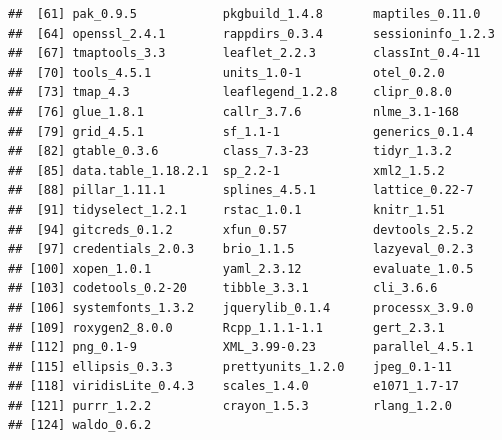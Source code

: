 \documentclass[
]{article}
\begin{document}
\begin{verbatim}
##  [61] pak_0.9.5            pkgbuild_1.4.8       maptiles_0.11.0     
##  [64] openssl_2.4.1        rappdirs_0.3.4       sessioninfo_1.2.3   
##  [67] tmaptools_3.3        leaflet_2.2.3        classInt_0.4-11     
##  [70] tools_4.5.1          units_1.0-1          otel_0.2.0          
##  [73] tmap_4.3             leaflegend_1.2.8     clipr_0.8.0         
##  [76] glue_1.8.1           callr_3.7.6          nlme_3.1-168        
##  [79] grid_4.5.1           sf_1.1-1             generics_0.1.4      
##  [82] gtable_0.3.6         class_7.3-23         tidyr_1.3.2         
##  [85] data.table_1.18.2.1  sp_2.2-1             xml2_1.5.2          
##  [88] pillar_1.11.1        splines_4.5.1        lattice_0.22-7      
##  [91] tidyselect_1.2.1     rstac_1.0.1          knitr_1.51          
##  [94] gitcreds_0.1.2       xfun_0.57            devtools_2.5.2      
##  [97] credentials_2.0.3    brio_1.1.5           lazyeval_0.2.3      
## [100] xopen_1.0.1          yaml_2.3.12          evaluate_1.0.5      
## [103] codetools_0.2-20     tibble_3.3.1         cli_3.6.6           
## [106] systemfonts_1.3.2    jquerylib_0.1.4      processx_3.9.0      
## [109] roxygen2_8.0.0       Rcpp_1.1.1-1.1       gert_2.3.1          
## [112] png_0.1-9            XML_3.99-0.23        parallel_4.5.1      
## [115] ellipsis_0.3.3       prettyunits_1.2.0    jpeg_0.1-11         
## [118] viridisLite_0.4.3    scales_1.4.0         e1071_1.7-17        
## [121] purrr_1.2.2          crayon_1.5.3         rlang_1.2.0         
## [124] waldo_0.6.2
\end{verbatim}
\end{document}
